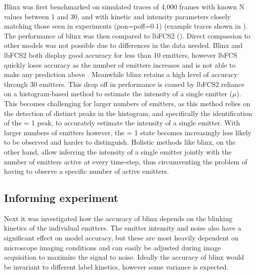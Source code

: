 Blinx was first benchmarked on simulated traces of 4,000 frames with known N
values between 1 and 30, and with kinetic and intensity parameters closely
matching those seen in experiments (pon=poff=0.1) (example traces shown in
). The performance of blinx was then compared to lbFCS2 (). 
Direct compassion to other models was not possible due to differences in
the data needed. Blinx and lbFCS2 both display good accuracy for less than 10 emitters,
however lbFCS quickly loses accuracy as the number of emitters increases and is not able to make any prediction above . Meanwhile blinx retains a
high level of accuracy through 30 emitters. This drop off in
performance is caused by lbFCS2 reliance on a histogram-based method to
estimate the intensity of a single emitter ($\mu$). This becomes challenging
for larger numbers of emitters, as this method relies on the detection of
distinct peaks in the histogram, and specifically the identification of the \y{} =
1 peak, to accurately estimate the intensity of a single emitter. With
larger numbers of emitters however, the \y{} = 1 state becomes increasingly
less likely to be observed and harder to distinguish. Holistic methods like
blinx, on the other hand, allow inferring the intensity of a single emitter
jointly with the number of emitters active at every time-step, thus
circumventing the problem of having to observe a specific number of active emitters.

\subsection{Informing experiment}

Next it was investigated how the accuracy of blinx depends on the blinking
kinetics of the individual emitters. The emitter intensity and noise also have a
significant effect on model accuracy, but these are most heavily dependent on
microscope imaging conditions and can easily be adjusted during image
acquisition to maximize the signal to noise. Ideally the accuracy of blinx
would be invariant to different label kinetics, however some variance is
expected.

